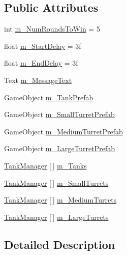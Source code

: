 \subsection*{Public Attributes}
\begin{DoxyCompactItemize}
\item 
int \hyperlink{class_game_manager_ad6d2c86bc87403f661a7d54c8f5e2983}{m\+\_\+\+Num\+Rounds\+To\+Win} = 5
\item 
float \hyperlink{class_game_manager_abaa4f38b4babf7616dbf9530488b8c16}{m\+\_\+\+Start\+Delay} = 3f
\item 
float \hyperlink{class_game_manager_a15a5dfa5777c7d7ff02f31bb86d3e412}{m\+\_\+\+End\+Delay} = 3f
\item 
Text \hyperlink{class_game_manager_ab48c44cba8cabaacd8b06a5a9f46c9ee}{m\+\_\+\+Message\+Text}
\item 
Game\+Object \hyperlink{class_game_manager_abd37cb1a8777348319275ea8d59f7879}{m\+\_\+\+Tank\+Prefab}
\item 
Game\+Object \hyperlink{class_game_manager_a596a0017adefe542ef4a42281c73a0e0}{m\+\_\+\+Small\+Turret\+Prefab}
\item 
Game\+Object \hyperlink{class_game_manager_aed7f73862c4a1e9758b57a87976ae22c}{m\+\_\+\+Medium\+Turret\+Prefab}
\item 
Game\+Object \hyperlink{class_game_manager_a24b78f6d931300efcb7d6eda6b0daddb}{m\+\_\+\+Large\+Turret\+Prefab}
\item 
\hyperlink{class_tank_manager}{Tank\+Manager} \mbox{[}$\,$\mbox{]} \hyperlink{class_game_manager_ad3c238e7c632868e7eb9c3feaae67647}{m\+\_\+\+Tanks}
\item 
\hyperlink{class_tank_manager}{Tank\+Manager} \mbox{[}$\,$\mbox{]} \hyperlink{class_game_manager_a269b3c5623b99271b0b27ba8f6cfdd74}{m\+\_\+\+Small\+Turrets}
\item 
\hyperlink{class_tank_manager}{Tank\+Manager} \mbox{[}$\,$\mbox{]} \hyperlink{class_game_manager_ac8a75ae671af94e8927aef7255db8bc7}{m\+\_\+\+Medium\+Turrets}
\item 
\hyperlink{class_tank_manager}{Tank\+Manager} \mbox{[}$\,$\mbox{]} \hyperlink{class_game_manager_a002f3308e2f113a89d091039744d2f91}{m\+\_\+\+Large\+Turrets}
\end{DoxyCompactItemize}


\subsection{Detailed Description}


